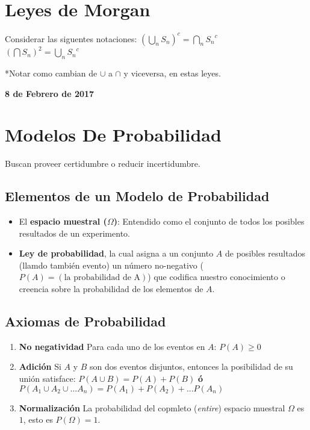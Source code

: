 \documentclass[]{book}
\providecommand{\tightlist}{%
  \setlength{\itemsep}{0pt}\setlength{\parskip}{0pt}}
\begin{document}
\section{Leyes de Morgan}\label{leyes-de-morgan}

Considerar las siguentes notaciones:
\((\bigcup_{n}^{}S_n)^c = \bigcap_{n}^{}{S_n}^c\)\\
 \((\bigcap S_n)^2 = \bigcup_{n}^{}{S_n}^c\)

*Notar como cambian de \(\cup\) a \(\cap\) y viceversa, en estas leyes.

\textbf{8 de Febrero de 2017}

\section{Modelos De Probabilidad}\label{modelos-de-probabilidad}

Buscan proveer certidumbre o reducir incertidumbre.

\subsection{Elementos de un Modelo de
Probabilidad}\label{elementos-de-un-modelo-de-probabilidad}

\begin{itemize}
\tightlist
\item
  El \textbf{espacio muestral (\(\Omega\))}: Entendido como el conjunto
  de todos los posibles resultados de un experimento.
\item
  \textbf{Ley de probabilidad}, la cual asigna a un conjunto \(A\) de
  posibles resultados (llamdo también evento) un número no-negativo
  (\(P(A) = (\text{la probabilidad de A})\)) que codifica nuestro
  conocimiento o creencia sobre la probabilidad de los elementos de
  \(A\).
\end{itemize}

\subsection{Axiomas de Probabilidad}\label{axiomas-de-probabilidad}

\begin{enumerate}
\def\labelenumi{\arabic{enumi}.}
\tightlist
\item
  \textbf{No negatividad} Para cada uno de los eventos en \(A\):
  \(P(A) \geq 0\)
\item
  \textbf{Adición} Si \(A\) y \(B\) son dos eventos disjuntos, entonces
  la posibilidad de su unión satisface: \(P(A \cup B) = P(A)+P(B)\)
  \textbf{ó} \(P(A_1\cup A_2 \cup ...A_n) = P(A_1) + P(A_2)+...P(A_n)\)
\item
  \textbf{Normalización} La probabilidad del copmleto (\emph{entire})
  espacio muestral \(\Omega\) es \(1\), esto es \(P(\Omega) = 1\).
\end{enumerate}
\end{document}
